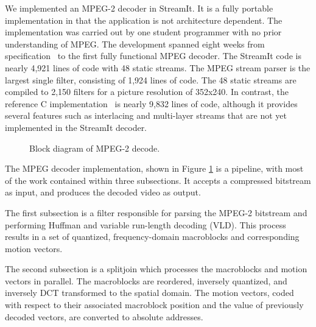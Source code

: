 
We implemented an MPEG-2 decoder in StreamIt. It is a fully portable
implementation in that the application is not architecture
dependent. The implementation was carried out by one student
programmer with no prior understanding of MPEG. The development
spanned eight weeks from specification~\cite{MPEG2} to the first fully
functional MPEG decoder. The StreamIt code is nearly 4,921 lines of
code with 48 static streams. The MPEG stream parser is the largest
single filter, consisting of 1,924 lines of code.  The 48 static
streams are compiled to 2,150 filters for a picture resolution of
352x240. In contrast, the reference C
implementation~\cite{reference-mpeg-c} is nearly 9,832 lines of code,
although it provides several features such as interlacing and
multi-layer streams that are not yet implemented in the StreamIt
decoder.


\begin{figure}[htbp]
\centerline{}
\caption{Block diagram of MPEG-2 decode.}
\label{fig:dec_block_detailed}
\end{figure}

The MPEG decoder implementation, shown in Figure 
\ref{fig:dec_block_detailed} is a pipeline, with most of the work
contained within three subsections. It accepts a compressed bitstream as input, and 
produces the decoded video as output. 

The first subsection is a filter responsible for
parsing the MPEG-2 bitstream and performing Huffman and variable
run-length decoding (VLD). This process results in a set of
quantized, frequency-domain macroblocks and corresponding motion
vectors. 

The second subsection is a splitjoin which processes the macroblocks
and motion vectors in parallel. The macroblocks are reordered, 
inversely quantized, and inversely DCT transformed to the spatial 
domain. The motion vectors, coded with respect to their associated
macroblock position and the value of previously decoded vectors,
are converted to absolute addresses.

